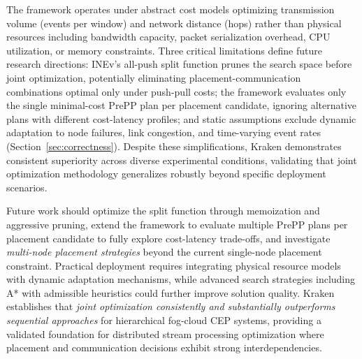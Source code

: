 The framework operates under abstract cost models optimizing transmission volume (events per window) and network distance (hops) rather than physical resources including bandwidth capacity, packet serialization overhead, CPU utilization, or memory constraints. Three critical limitations define future research directions: INEv's all-push split function prunes the search space before joint optimization, potentially eliminating placement-communication combinations optimal only under push-pull costs; the framework evaluates only the single minimal-cost PrePP plan per placement candidate, ignoring alternative plans with different cost-latency profiles; and static assumptions exclude dynamic adaptation to node failures, link congestion, and time-varying event rates (Section~\ref{sec:correctness}). Despite these simplifications, Kraken demonstrates consistent superiority across diverse experimental conditions, validating that joint optimization methodology generalizes robustly beyond specific deployment scenarios.

Future work should optimize the split function through memoization and aggressive pruning, extend the framework to evaluate multiple PrePP plans per placement candidate to fully explore cost-latency trade-offs, and investigate \emph{multi-node placement strategies} beyond the current single-node placement constraint. Practical deployment requires integrating physical resource models with dynamic adaptation mechanisms, while advanced search strategies including A* with admissible heuristics could further improve solution quality. Kraken establishes that \emph{joint optimization consistently and substantially outperforms sequential approaches} for hierarchical fog-cloud CEP systems, providing a validated foundation for distributed stream processing optimization where placement and communication decisions exhibit strong interdependencies.